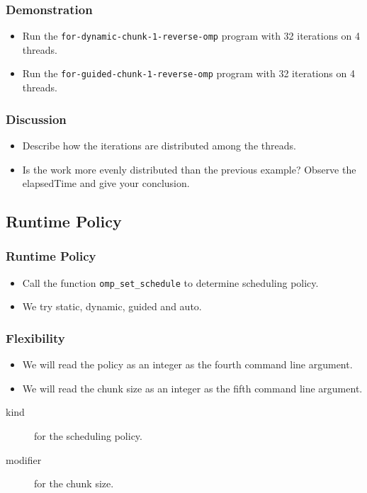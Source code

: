 \documentclass{beamer}
\begin{document}
\begin{frame}
  \frametitle{Demonstration}
  \begin{itemize}
  \item Run the {\tt for-dynamic-chunk-1-reverse-omp} program with 32
    iterations on 4 threads.
  \item Run the {\tt for-guided-chunk-1-reverse-omp} program with 32
    iterations on 4 threads.
  \end{itemize}
\end{frame}

\begin{frame}
  \frametitle{Discussion}
  \begin{itemize}
  \item Describe how the iterations are distributed among the threads.
  \item Is the work more evenly distributed than the previous example?
    Observe the elapsedTime and give your conclusion.
  \end{itemize}
\end{frame}

\subsection{Runtime Policy}

\begin{frame}
  \frametitle{Runtime Policy}
  \begin{itemize}
  \item Call the function {\tt omp\_set\_schedule} to determine scheduling
    policy.
  \item We try static, dynamic, guided and auto. 
  \end{itemize}
\end{frame}

\begin{frame}
  \frametitle{Flexibility}
  \begin{itemize}
  \item We will read the policy as an integer as the fourth command line
    argument.
  \item We will read the chunk size as an integer as the fifth command
    line argument.
  \end{itemize}
\end{frame}

\begin{frame}
  \begin{description}
  \item [kind] for the scheduling policy.
  \item [modifier] for the chunk size.
  \end{description}
\end{frame}
\end{document}
